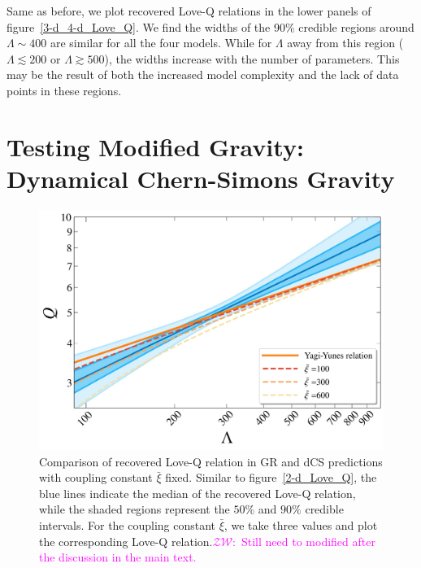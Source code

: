 \documentclass[a4paper,11pt]{article}
\newcommand{\ZW}[1]{\textcolor{magenta}{$\mathcal{ZW}$:~#1}}
\begin{document}
Same as before, we plot recovered Love-Q relations in the lower panels of 
figure~\ref{3-d_4-d_Love_Q}. We find the widths of the 90\% credible regions 
around $\Lambda \sim 400$ are similar for all the four models. While for
$\Lambda$ away from this region ($\Lambda \lesssim 200$ or $\Lambda \gtrsim 500$), 
the widths increase with the number of parameters. This may be the result of both 
the increased model complexity and the lack of data points in these
regions. 

\section{Testing Modified Gravity: Dynamical Chern-Simons Gravity}
\label{sec:dCS}

\begin{figure}[t]
    \centering
    \begin{minipage}{0.6\linewidth}
        \includegraphics[width=\linewidth]{CS_xi_bar_APR4_2d.pdf}
    \end{minipage}
    \caption{Comparison of recovered Love-Q relation in GR
    and dCS predictions 
    with coupling constant $\bar{\xi}$ fixed. Similar to figure~\ref{2-d_Love_Q}, the
    blue lines indicate the median of the recovered Love-Q relation, while the
    shaded regions represent the $50\%$ and $90\%$ credible intervals. For the coupling constant 
    $\bar\xi$, we take three values
    and plot the corresponding Love-Q relation.\ZW{Still need to
    modified after the discussion in the main text.}}
    \label{cs_Love_Q}
\end{figure}
\end{document}
